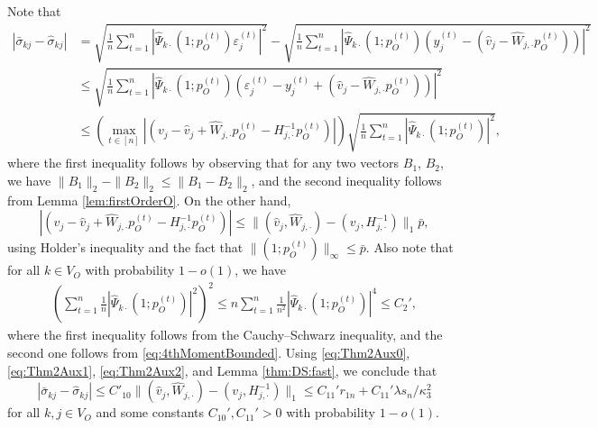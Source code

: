 \documentclass[opre,nonblindrev]{informs3} %
\begin{document}
\begin{APPENDIX}{}
Note that
\begin{equation} \label{eq:Thm2Aux0}
\begin{aligned}
|\bar\sigma_{kj}-\hat\sigma_{kj}| &= 
\sqrt{\frac{1}{n} \sum_{t=1}^n |\hat\Psi_{k\cdot}(1;p_O^{(t)}) \varepsilon_j^{(t)}|^2}
-
\sqrt{
\frac{1}{n} \sum_{t=1}^n |\hat\Psi_{k\cdot}(1;p_O^{(t)})
(y_j^{(t)}-(\hat v_j-\hat W_{j,\cdot}p_O^{(t)}))
|^2
}\\
&\leq 
\sqrt{
	\frac{1}{n} \sum_{t=1}^n |\hat\Psi_{k\cdot}(1;p_O^{(t)}) (\varepsilon_j^{(t)}-y_j^{(t)}+(\hat v_j-\hat W_{j,\cdot}p_O^{(t)}))|^2
}\\
&\leq 
\left(\max_{t\in [n]}\left|(v_j-\hat v_j+
\hat W_{j,\cdot}p_O^{(t)}-
H^{-1}_{j,\cdot}p_O^{(t)})\right|
\right)
\sqrt{
	\frac{1}{n} \sum_{t=1}^n |\hat\Psi_{k\cdot}(1;p_O^{(t)}) |^2
}, 
\end{aligned}
\end{equation}
where the first inequality follows by observing that for any two vectors $B_1$, $B_2$, we have
$\|B_1\|_2 - \|B_2\|_2 \leq 
\|B_1 -B_2\|_2$, and the second inequality follows from Lemma \ref{lem:firstOrderO}.
On the other hand, 
\begin{equation} \label{eq:Thm2Aux1}
\left|(v_j-\hat v_j+
\hat W_{j,\cdot}p_O^{(t)}-
H^{-1}_{j,\cdot}p_O^{(t)})\right| \leq \|(\hat v_j,\hat{W}_{j,\cdot}) - (v_j, H^{-1}_{j,\cdot})\|_1  \bar{p},
\end{equation}
using Holder's inequality and the fact that $\|(1;p_O^{(t)}) \|_\infty \leq \bar{p}$.
 Also note that for all $k\in V_O$ with probability $1-o(1)$, we have
\begin{equation}\label{eq:Thm2Aux2}
\begin{aligned}
	\left(\sum_{t=1}^n \frac{1}{n} |\hat\Psi_{k\cdot}(1;p_O^{(t)}) |^2\right)^2 
	\leq {n}\sum_{t=1}^n 
	\frac{1}{n^2}
	|\hat\Psi_{k\cdot}(1;p_O^{(t)}) |^4
	\leq C_2',
\end{aligned}	
\end{equation}
where the first inequality follows from the Cauchy--Schwarz inequality, and the second one follows from
\eqref{eq:4thMomentBounded}.
Using \eqref{eq:Thm2Aux0}, \eqref{eq:Thm2Aux1},  \eqref{eq:Thm2Aux2}, and Lemma \ref{thm:DS:fast}, we conclude that
\begin{equation}
|\bar\sigma_{kj}-\hat\sigma_{kj}| \leq C'_{10}  \|(\hat v_j,\hat{W}_{j,\cdot}) - (v_j, H^{-1}_{j,\cdot})\|_1 \leq
 C_{11}' r_{1n} + C_{11}' \lambda s_n/\kappa^2_{3}
\end{equation}
for 
all $k,j \in V_O$ and
some constants $C_{10}',C_{11}'>0$ with probability $1-o(1)$.

\end{APPENDIX}
\end{document}
